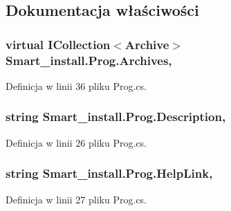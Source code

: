 \subsection{Dokumentacja właściwości}
\hypertarget{class_smart__install_1_1_prog_a99ebc844dd08ab8e8b3baf64e68067f4}{
\subsubsection[{Archives}]{\setlength{\rightskip}{0pt plus 5cm}virtual I\+Collection$<${\bf Archive}$>$ Smart\+\_\+install.\+Prog.\+Archives\hspace{0.3cm}{\ttfamily [get]}, {\ttfamily [set]}}}\label{class_smart__install_1_1_prog_a99ebc844dd08ab8e8b3baf64e68067f4}


Definicja w linii 36 pliku Prog.\+cs.

\hypertarget{class_smart__install_1_1_prog_aca24c50cd14e1b94afe4e11ab6473374}{
\subsubsection[{Description}]{\setlength{\rightskip}{0pt plus 5cm}string Smart\+\_\+install.\+Prog.\+Description\hspace{0.3cm}{\ttfamily [get]}, {\ttfamily [set]}}}\label{class_smart__install_1_1_prog_aca24c50cd14e1b94afe4e11ab6473374}


Definicja w linii 26 pliku Prog.\+cs.

\hypertarget{class_smart__install_1_1_prog_a01ce20f56b0c1d25333642c479fc0ca8}{
\subsubsection[{Help\+Link}]{\setlength{\rightskip}{0pt plus 5cm}string Smart\+\_\+install.\+Prog.\+Help\+Link\hspace{0.3cm}{\ttfamily [get]}, {\ttfamily [set]}}}\label{class_smart__install_1_1_prog_a01ce20f56b0c1d25333642c479fc0ca8}


Definicja w linii 27 pliku Prog.\+cs.

